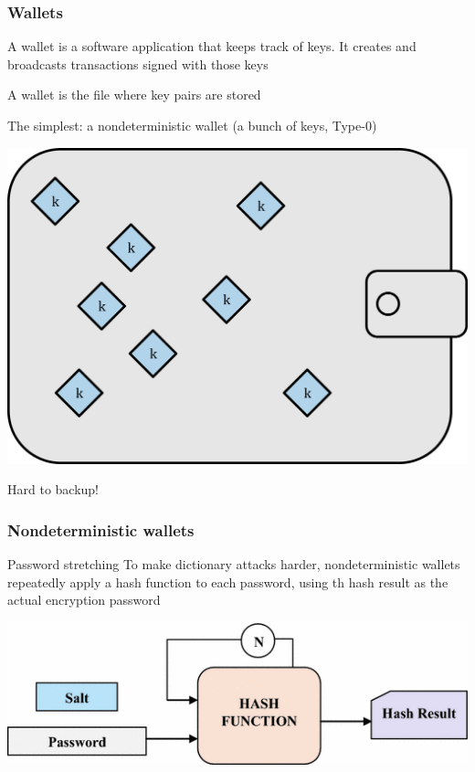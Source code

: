 \documentclass[11pt]{beamer}  %
\begin{document}
\begin{frame}
  \frametitle{Wallets}

  \begin{greenbox}{}
    A wallet is a software \alert{application} that keeps track of keys.
    It creates and broadcasts transactions signed with those keys
  \end{greenbox}

  \bigskip

  \begin{greenbox}{}
    A wallet is the \alert{file} where key pairs are stored
  \end{greenbox}

  \bigskip
  \begin{greenbox}{The simplest: a nondeterministic wallet (a bunch of keys, Type-0)}
    \begin{center}
      \includegraphics[scale=0.45,clip=false]{pictures/mbc2_0501.png}
    \end{center}
    Hard to backup!
  \end{greenbox}

\end{frame}

\begin{frame}\frametitle{Nondeterministic wallets}

  \begin{greenbox}{Password stretching}
    To make dictionary attacks harder, nondeterministic
    wallets repeatedly apply a hash function
    to each password, using th hash result as the actual encryption password
  \begin{center}
    \includegraphics[width=\textwidth,clip=false]{pictures/key-derivation-function.png}
  \end{center}
  \end{greenbox}

\end{frame}
\end{document}
